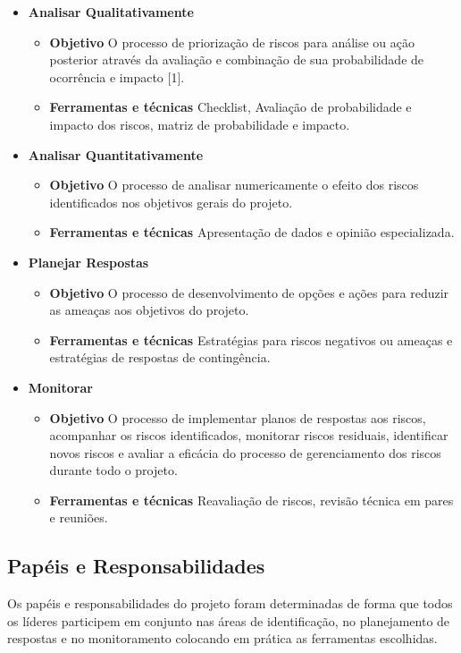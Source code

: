 \begin{apendicesenv}
\begin{itemize}
    \item \textbf{Analisar Qualitativamente}
        \begin{itemize}
            \item \textbf{Objetivo}
            O processo de priorização de riscos para análise ou ação posterior através da avaliação e combinação de sua probabilidade de ocorrência e impacto [1].
            \item \textbf{Ferramentas e técnicas}
            Checklist, Avaliação de probabilidade e impacto dos riscos, matriz de probabilidade e impacto.
        \end{itemize}
    \item \textbf{Analisar Quantitativamente}
        \begin{itemize}
            \item \textbf{Objetivo}
            O processo de analisar numericamente o efeito dos riscos identificados nos objetivos gerais do projeto.
            \item \textbf{Ferramentas e técnicas}
            Apresentação de dados e opinião especializada.
        \end{itemize}
    \item \textbf{Planejar Respostas}
        \begin{itemize}
            \item \textbf{Objetivo}
            O processo de desenvolvimento de opções e ações para reduzir as ameaças aos objetivos do projeto.
            \item \textbf{Ferramentas e técnicas}
            Estratégias para riscos negativos ou ameaças e estratégias de respostas de contingência.
        \end{itemize}
    \item \textbf{Monitorar}
        \begin{itemize}
            \item \textbf{Objetivo}
            O processo de implementar planos de respostas aos riscos, acompanhar os riscos identificados, monitorar riscos residuais, identificar novos riscos e avaliar a eficácia do processo de gerenciamento dos riscos durante todo o projeto.
            \item \textbf{Ferramentas e técnicas}
            Reavaliação de riscos, revisão técnica em pares e reuniões.
        \end{itemize}
\end{itemize}


\subsection{Papéis e Responsabilidades}
Os papéis e responsabilidades do projeto foram determinadas de forma que todos os líderes participem em conjunto nas áreas de identificação, no planejamento de respostas e no monitoramento colocando em prática as ferramentas escolhidas.


\end{apendicesenv}
